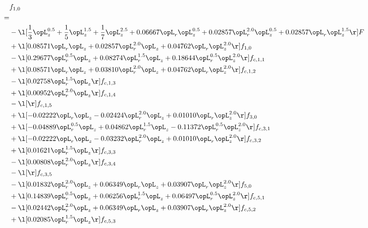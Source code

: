 \begin{alignat}{2} 
\label{eq:f_10_1} 
& f_{1,0} \nonumber \\ 
 = \\ 
& - \l[ \frac{1}{3} \opL_z^{0.5} + \frac{1}{5} \opL_z^{1.5} + \frac{1}{7} \opL_z^{2.5} +  0.06667 \opL_r \opL_z^{0.5} +  0.02857 \opL_r^{2.0} \opL_z^{0.5} +  0.02857 \opL_r \opL_z^{1.5}  \r] F \nonumber \\ 
& + \l[  0.08571 \opL_r \opL_z +  0.02857 \opL_r^{2.0} \opL_z +  0.04762 \opL_r \opL_z^{2.0}  \r] f_{1,0} \nonumber \\ 
& - \l[  0.29677 \opL_r^{0.5} \opL_z +  0.08274 \opL_r^{1.5} \opL_z +  0.18644 \opL_r^{0.5} \opL_z^{2.0}  \r] f_{c,1,1} \nonumber \\ 
& + \l[  0.08571 \opL_r \opL_z +  0.03810 \opL_r^{2.0} \opL_z +  0.04762 \opL_r \opL_z^{2.0}  \r] f_{c,1,2} \nonumber \\ 
& - \l[  0.02758 \opL_r^{1.5} \opL_z  \r] f_{c,1,3} \nonumber \\ 
& + \l[  0.00952 \opL_r^{2.0} \opL_z  \r] f_{c,1,4} \nonumber \\ 
& - \l[  \r] f_{c,1,5} \nonumber \\ 
& + \l[  -0.02222 \opL_r \opL_z   -0.02424 \opL_r^{2.0} \opL_z +  0.01010 \opL_r \opL_z^{2.0}  \r] f_{3,0} \nonumber \\ 
& + \l[  -0.04889 \opL_r^{0.5} \opL_z +  0.04862 \opL_r^{1.5} \opL_z   -0.11372 \opL_r^{0.5} \opL_z^{2.0}  \r] f_{c,3,1} \nonumber \\ 
& + \l[  -0.02222 \opL_r \opL_z   -0.03232 \opL_r^{2.0} \opL_z +  0.01010 \opL_r \opL_z^{2.0}  \r] f_{c,3,2} \nonumber \\ 
& + \l[  0.01621 \opL_r^{1.5} \opL_z  \r] f_{c,3,3} \nonumber \\ 
& - \l[  0.00808 \opL_r^{2.0} \opL_z  \r] f_{c,3,4} \nonumber \\ 
& - \l[  \r] f_{c,3,5} \nonumber \\ 
& - \l[  0.01832 \opL_r^{2.0} \opL_z +  0.06349 \opL_r \opL_z +  0.03907 \opL_r \opL_z^{2.0}  \r] f_{5,0} \nonumber \\ 
& + \l[  0.14839 \opL_r^{0.5} \opL_z +  0.06256 \opL_r^{1.5} \opL_z +  0.06497 \opL_r^{0.5} \opL_z^{2.0}  \r] f_{c,5,1} \nonumber \\ 
& - \l[  0.02442 \opL_r^{2.0} \opL_z +  0.06349 \opL_r \opL_z +  0.03907 \opL_r \opL_z^{2.0}  \r] f_{c,5,2} \nonumber \\ 
& + \l[  0.02085 \opL_r^{1.5} \opL_z  \r] f_{c,5,3} \nonumber \\ 

\end{alignat}
